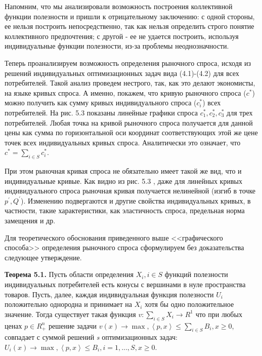 \documentclass[12pt, 4paper]{book}
\begin{document}
{Напомним, что мы анализировали возможность построения коллективной функции полезности и пришли к отрицательному заключению: с одной стороны, ее нельзя построить непосредственно, так как нельзя определить строго понятие коллективного предпочтения; с другой - ее не удается построить, используя индивидуальные функции полезности, из-за проблемы неоднозначности.
\par

Теперь проанализируем возможность определения рыночного спроса, исходя из решений индивидуальных оптимизационных задач вида (4.1)-(4.2) для всех потребителей. Такой анализ проведем нестрого, так, как это делают экономисты, на языке кривых спроса.  А именно, покажем, что кривую рыночного спроса ($c^{*}$) можно получить как сумму кривых индивидуального спроса ($c_{i}^{*}$) всех потребителей. На  рис. 5.3 показаны линейные графики спроса $c_{1}^{*},c_{2}^{*},c_{3}^{*}$ для трех потребителей. Любая точка на кривой рыночного спроса получается для данной цены как сумма по горизонтальной оси координат соответствующих этой же цене точек всех индивидуальных кривых спроса. Аналитически это означает, что $c^{*} = \sum\limits_{i \in S}c_{i}^{*}$. 
\par

При этом рыночная кривая спроса не обязательно имеет такой же вид, что и индивидуальные кривые. Как видно из  рис. 5.3 , даже для линейных кривых индивидуального спроса рыночная кривая получается нелинейной (изгиб в точке $p^{'},Q^{'}$). Изменению подвергаются и другие свойства индивидуальных кривых, в частности, такие характеристики, как эластичность спроса, предельная норма замещения и др.
\par

Для теоретического обоснования приведенного выше <<графического способа>> определения рыночного спроса сформулируем без доказательства следующее утверждение.
\par

\textbf{Теорема 5.1.} Пусть области определения $X_i,i \in S$ функций полезности индивидуальных потребителей есть конусы с вершинами в нуле пространства товаров. Пусть, далее, каждая индивидуальная функция полезности $U_i$ положительно однородна и принимает на $X_i$ хотя бы одно положительное значение. Тогда существует такая функция $v:\sum\limits_{i \in S}X_i \rightarrow R^{1}$  что при любых ценах $p \in R_{+}^{n}$ решение задачи $v(x)\rightarrow \max, \left\langle p,x \right\rangle \leq \sum\limits_{i \in S}B_i,x \geq 0$, совпадает с суммой решений \textit{s} оптимизационных задач: $U_i(x)\rightarrow \max, \left\langle p,x \right\rangle \leq B_i,i=1,...,S, x\geq 0$.
\par

}
\end{document}
